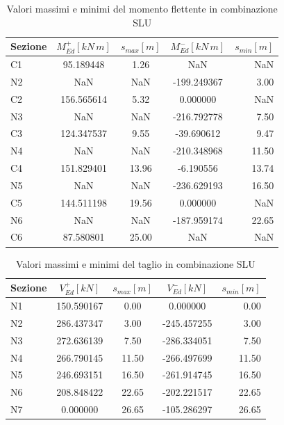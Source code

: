 \begin{table}
	\centering
	\caption{Valori massimi e minimi del momento flettente in combinazione SLU}
	\label{tab:bendingMoment_slu}
    \begin{tabular*}{\textwidth}{l @{\extracolsep{\fill}} cccr}
\toprule
Sezione &  $M_{Ed}^+ [kN\,m]$ &  $s_{max} [m]$ &  $M_{Ed}^- [kN\,m]$ &  $s_{min} [m] $\\
\midrule
    C1 &    95.189448 &      1.26 &          NaN &       NaN \\
    N2 &          NaN &       NaN &  -199.249367 &      3.00 \\
    C2 &   156.565614 &      5.32 &     0.000000 &       NaN \\
    N3 &          NaN &       NaN &  -216.792778 &      7.50 \\
    C3 &   124.347537 &      9.55 &   -39.690612 &      9.47 \\
    N4 &          NaN &       NaN &  -210.348968 &     11.50 \\
    C4 &   151.829401 &     13.96 &    -6.190556 &     13.74 \\
    N5 &          NaN &       NaN &  -236.629193 &     16.50 \\
    C5 &   144.511198 &     19.56 &     0.000000 &       NaN \\
    N6 &          NaN &       NaN &  -187.959174 &     22.65 \\
    C6 &    87.580801 &     25.00 &          NaN &       NaN \\
\bottomrule
    \end{tabular*}
\end{table}

\begin{table}
	\centering
	\caption{Valori massimi e minimi del taglio in combinazione SLU}
	\label{tab:shear_slu}
    \begin{tabular*}{\textwidth}{l @{\extracolsep{\fill}} cccr}
\toprule
Sezione &   $V_{Ed}^+ [kN]$ &  $s_{max} [m]$ &   $V_{Ed}^- [kN]$ &  $s_{min} [m]$ \\
\midrule
N1 &  150.590167 &      0.00 &    0.000000 &      0.00 \\
N2 &  286.437347 &      3.00 & -245.457255 &      3.00 \\
N3 &  272.636139 &      7.50 & -286.334051 &      7.50 \\
N4 &  266.790145 &     11.50 & -266.497699 &     11.50 \\
N5 &  246.693151 &     16.50 & -261.914745 &     16.50 \\
N6 &  208.848422 &     22.65 & -202.221517 &     22.65 \\
N7 &    0.000000 &     26.65 & -105.286297 &     26.65 \\
\bottomrule
    \end{tabular*}
\end{table}

